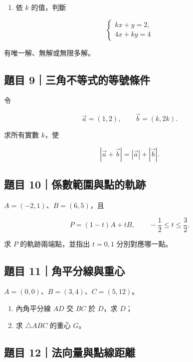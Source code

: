 \documentclass[11pt,a4paper]{article}
\providecommand{\tightlist}{%
  \setlength{\itemsep}{0pt}\setlength{\parskip}{0pt}}
\begin{document}
\begin{enumerate}
\def\labelenumi{\arabic{enumi}.}
\setcounter{enumi}{1}
\tightlist
\item
  依 \(k\) 的值，判斷
\end{enumerate}

\[
\begin{cases}
kx+y=2,\\
4x+ky=4
\end{cases}
\]

有唯一解、無解或無限多解。

\subsection{題目 9｜三角不等式的等號條件}\label{ux984cux76ee-9ux4e09ux89d2ux4e0dux7b49ux5f0fux7684ux7b49ux865fux689dux4ef6}

令

\[
\vec a=(1,2),
\qquad
\vec b=(k,2k).
\]

求所有實數 \(k\)，使

\[
|\vec a+\vec b|=|\vec a|+|\vec b|.
\]

\subsection{題目 10｜係數範圍與點的軌跡}\label{ux984cux76ee-10ux4fc2ux6578ux7bc4ux570dux8207ux9edeux7684ux8eccux8de1}

\(A=(-2,1)\)、\(B=(6,5)\)，且

\[
P=(1-t)A+tB,
\qquad -\frac12\le t\le\frac32.
\]

求 \(P\) 的軌跡兩端點，並指出 \(t=0,1\) 分別對應哪一點。

\subsection{題目 11｜角平分線與重心}\label{ux984cux76ee-11ux89d2ux5e73ux5206ux7ddaux8207ux91cdux5fc3}

\(A=(0,0)\)、\(B=(3,4)\)、\(C=(5,12)\)。

\begin{enumerate}
\def\labelenumi{\arabic{enumi}.}
\tightlist
\item
  內角平分線 \(AD\) 交 \(BC\) 於 \(D\)，求 \(D\)；
\item
  求 \(\triangle ABC\) 的重心 \(G\)。
\end{enumerate}

\subsection{題目 12｜法向量與點線距離}\label{ux984cux76ee-12ux6cd5ux5411ux91cfux8207ux9edeux7ddaux8dddux96e2}
\end{document}
